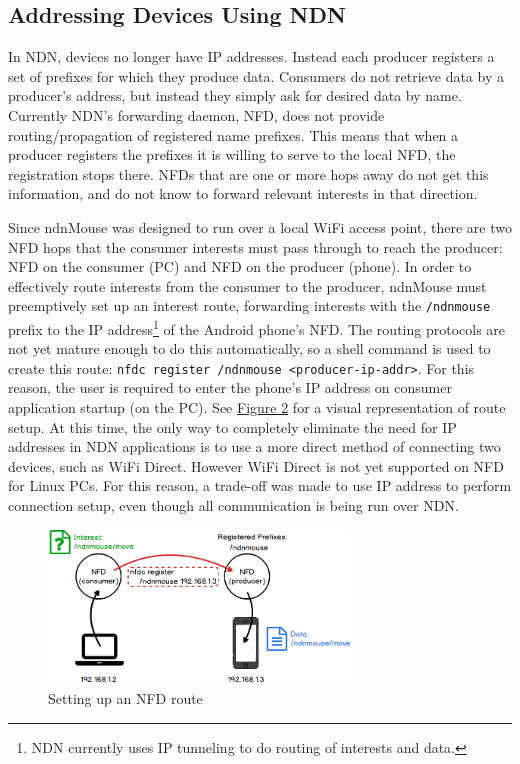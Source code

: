 \documentclass{sig-alternate}
\renewcommand\_{\textunderscore\allowbreak}  %
\begin{document}
\subsection{Addressing Devices Using NDN}
In NDN, devices no longer have IP addresses. Instead each producer registers a set of prefixes for which they produce data. Consumers do not retrieve data by a producer's address, but instead they simply ask for desired data by name. Currently NDN's forwarding daemon, NFD, does not provide routing/propagation of registered name prefixes. This means that when a producer registers the prefixes it is willing to serve to the local NFD, the registration stops there. NFDs that are one or more hops away do not get this information, and do not know to forward relevant interests in that direction.

Since ndnMouse was designed to run over a local WiFi access point, there are two NFD hops that the consumer interests must pass through to reach the producer: NFD on the consumer (PC) and NFD on the producer (phone). In order to effectively route interests from the consumer to the producer, ndnMouse must preemptively set up an interest route, forwarding interests with the \texttt{/ndnmouse} prefix to the IP address\footnote{NDN currently uses IP tunneling to do routing of interests and data.} of the Android phone's NFD. The routing protocols are not yet mature enough to do this automatically, so a shell command is used to create this route: \texttt{nfdc register /ndnmouse <producer-ip-addr>}. For this reason, the user is required to enter the phone's IP address on consumer application startup (on the PC). See \hyperlink{fig:routeSetup}{Figure 2} for a visual representation of route setup. At this time, the only way to completely eliminate the need for IP addresses in NDN applications is to use a more direct method of connecting two devices, such as WiFi Direct. However WiFi Direct is not yet supported on NFD for Linux PCs. For this reason, a trade-off was made to use IP address to perform connection setup, even though all communication is being run over NDN.

\begin{figure}
	\centering
	\hypertarget{fig:routeSetup}{}
	\includegraphics[width=8cm]{diagrams/routeSetup}
	\caption{Setting up an NFD route}
\end{figure}
\end{document}
